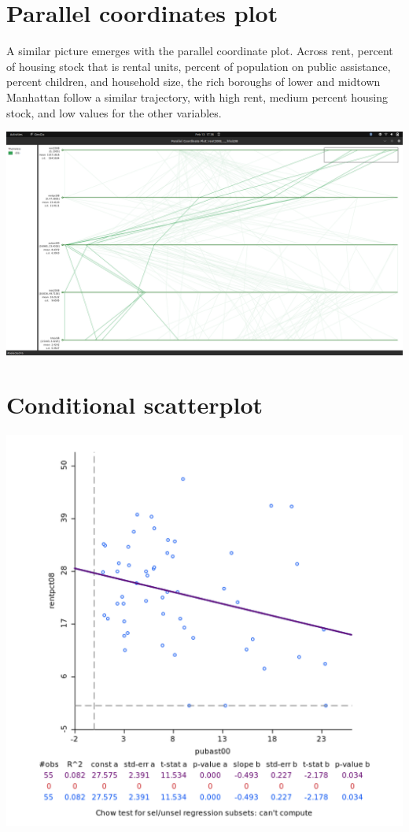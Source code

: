 \documentclass[11pt]{article}
\begin{document}
\section{Parallel coordinates plot}
\label{sec:orgb61433c}
A similar picture emerges with the parallel coordinate plot. Across rent, percent of housing stock that is rental units, percent of population on public assistance, percent children, and household size, the rich boroughs of lower and midtown Manhattan follow a similar trajectory, with high rent, medium percent housing stock, and low values for the other variables.

\begin{center}
\includegraphics[width=.9\linewidth]{parallel_coord.png}
\end{center}

\section{Conditional scatterplot}
\label{sec:org4a7c5e1}
\begin{center}
\includegraphics[width=.9\linewidth]{rent_pub_ast_scatter.png}
\end{center}
\end{document}
